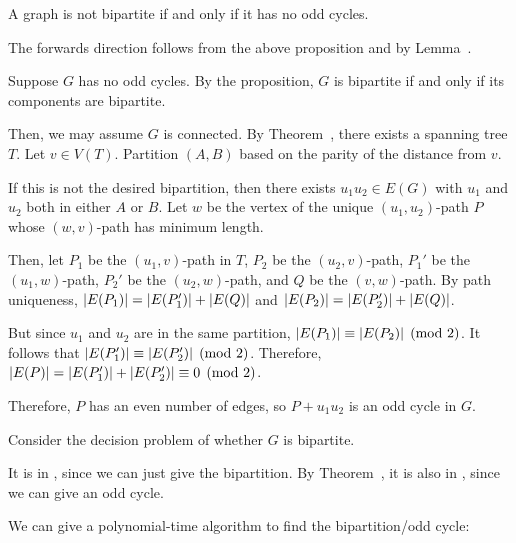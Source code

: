 \documentclass[class=math239,notes,tikz]{agony}
\begin{document}
\begin{theorem}[5.3.2]\label{thm:oddbi}
  A graph is not bipartite if and only if it has no odd cycles.
\end{theorem}
\begin{prf}
  The forwards direction follows from the above proposition
  and by Lemma~.

  Suppose $G$ has no odd cycles.
  By the proposition, $G$ is bipartite if and only if its components are bipartite.

  Then, we may assume $G$ is connected.
  By Theorem~, there exists a spanning tree $T$.
  Let $v \in V(T)$.
  Partition $(A,B)$ based on the parity of the distance from $v$.

  If this is not the desired bipartition, then there exists $u_1u_2 \in E(G)$
  with $u_1$ and $u_2$ both in either $A$ or $B$.
  Let $w$ be the vertex of the unique $(u_1, u_2)$-path $P$
  whose $(w,v)$-path has minimum length.

  Then, let $P_1$ be the $(u_1,v)$-path in $T$, $P_2$ be the $(u_2,v)$-path,
  $P_1'$ be the $(u_1,w)$-path, $P_2'$ be the $(u_2,w)$-path,
  and $Q$ be the $(v,w)$-path.
  By path uniqueness, $\abs{E(P_1)} = \abs{E(P_1')} + \abs{E(Q)}$
  and $\abs{E(P_2)} = \abs{E(P_2')} + \abs{E(Q)}$.

  But since $u_1$ and $u_2$ are in the same partition,
  $\abs{E(P_1)} \equiv \abs{E(P_2)} \pmod{2}$.
  It follows that $\abs{E(P_1')} \equiv \abs{E(P_2')} \pmod{2}$.
  Therefore, $\abs{E(P)} = \abs{E(P_1')} + \abs{E(P_2')} \equiv 0 \pmod{2}$.

  Therefore, $P$ has an even number of edges, so $P + u_1u_2$ is an odd cycle in $G$.
\end{prf}

Consider the decision problem of whether $G$ is bipartite.

It is in \NP, since we can just give the bipartition.
By Theorem~, it is also in \coNP, since we can give an odd cycle.

We can give a polynomial-time algorithm to find the bipartition/odd cycle:
\end{document}
